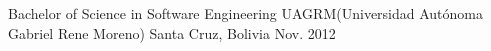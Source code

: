 \begin{cventries}
  \cventry
    {Bachelor of Science in Software Engineering }
    {UAGRM(Universidad Autónoma Gabriel Rene Moreno)}
    {Santa Cruz, Bolivia}
    {Nov. 2012}
    {
      \begin{cvitems}
         {
        }
      \end{cvitems}
    }
\end{cventries}
